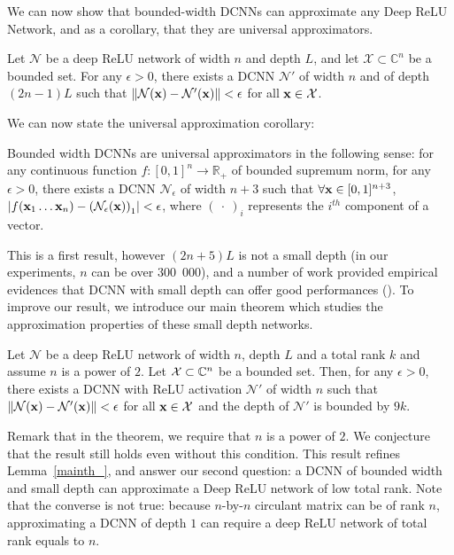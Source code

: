 We can now show that bounded-width DCNNs can approximate any Deep ReLU Network, and as a corollary, that they are universal approximators.

\begin{lemma} \label{mainth_}
  Let $\mathcal{N}$ be a deep ReLU network of width $n$ and depth $L$, and let $\mathcal{X} \subset \mathbb{C}^{n}$ be a bounded set. For any $\epsilon > 0$, there exists a DCNN $\mathcal{N}'$ of width $n$ and of depth $(2n-1)L$ such that $\norm{\mathcal{N}(\mathbf{x}) - \mathcal{N}'(\mathbf{x})} < \epsilon$ for all $\mathbf{x} \in \mathcal{X}$.
\end{lemma}

We can now state the universal approximation corollary:

\begin{corollary} \label{cor:universal}
Bounded width DCNNs are universal approximators in the following sense: for any continuous function $f:[0,1]^{n}\rightarrow\mathbb{R}_+$ of bounded supremum norm,
for any $\epsilon > 0$, there exists a DCNN
$\mathcal{N}_{\epsilon}$ of width $n+3$ such that $\forall \mathbf{x} \in [0,1]^{n+3}$, $\left| f(\xvec_{1} \ldots \xvec_{n}) - \left( \mathcal{N}_{\epsilon} \left( \xvec \right) \right)_{1} \right| < \epsilon$, where $\left(\ \cdot\ \right)_{i}$ represents the $i^{th}$ component of a vector.
\end{corollary}

This is a first result, however $(2n+5)L$ is not a small depth (in our experiments, $n$ can be over 300~000), and a number of work provided empirical evidences that DCNN with small depth can offer good performances (\emph{\cite{anca2018eccv,cheng}}). To improve our result, we introduce our main theorem which studies the approximation properties of these small depth networks.

\begin{theorem} \label{theorem:low_rank_nn}
Let $\mathcal{N}$ be a deep ReLU network of width $n$, depth $L$ and a total rank $k$ and assume $n$ is a power of $2$.
Let $\mathcal{X} \subset {\ensuremath \mathbb{C}}^{n}$ be a bounded set.
Then, for any $\epsilon > 0$, there exists a DCNN with ReLU activation $\mathcal{N}'$ of width $n$ such that $\norm{ \mathcal{N}(\mathbf{x}) - \mathcal{N}'(\mathbf{x})} < \epsilon$ for all $\mathbf{x} \in \mathcal{X}$ and the depth of $\mathcal{N}'$ is bounded by $9k$.
\end{theorem}

Remark that in the theorem, we require that $n$ is a power of $2$.
We conjecture that the result still holds even without this condition.
This result refines Lemma~\ref{mainth_}, and answer our second question: a DCNN of bounded width and small depth can approximate a Deep ReLU network of low  total rank.
Note that the converse is not true: because $n$-by-$n$ circulant matrix can be of rank $n$, approximating a DCNN of depth $1$ can require a deep ReLU network of total rank equals to $n$.

